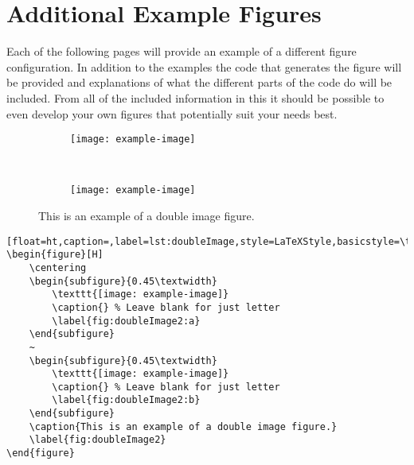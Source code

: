 \chapter{Additional Example Figures}\label{app:examplefigures}
	Each of the following pages will provide an example of a different figure configuration. 
	In addition to the examples the code that generates the figure will be provided and explanations of what the different parts of the code do will be included.
	From all of the included information in this  it should be possible to even develop your own figures that potentially suit your needs best.
		
		\clearpage



		\vspace*{\fill}
		\begin{figure}[H]
			\centering
			\begin{subfigure}{0.45\textwidth}
				\texttt{[image: example-image]}
				\caption{} %
				\label{fig:doubleImage2:a}
			\end{subfigure}
			~
			\begin{subfigure}{0.45\textwidth}
				\texttt{[image: example-image]}
				\caption{} %
				\label{fig:doubleImage2:b}
			\end{subfigure}
			\caption{This is an example of a double image figure.}
			\label{fig:doubleImage2}
		\end{figure}
		\begin{lstlisting}[float=ht,caption=,label=lst:doubleImage,style=LaTeXStyle,basicstyle=\tiny\ttfamily,]
\begin{figure}[H]
	\centering
	\begin{subfigure}{0.45\textwidth}
		\texttt{[image: example-image]}
		\caption{} % Leave blank for just letter
		\label{fig:doubleImage2:a}
	\end{subfigure}
	~
	\begin{subfigure}{0.45\textwidth}
		\texttt{[image: example-image]}
		\caption{} % Leave blank for just letter
		\label{fig:doubleImage2:b}
	\end{subfigure}
	\caption{This is an example of a double image figure.}
	\label{fig:doubleImage2}
\end{figure}
		\end{lstlisting}
		\vspace*{\fill}
		\pagebreak



